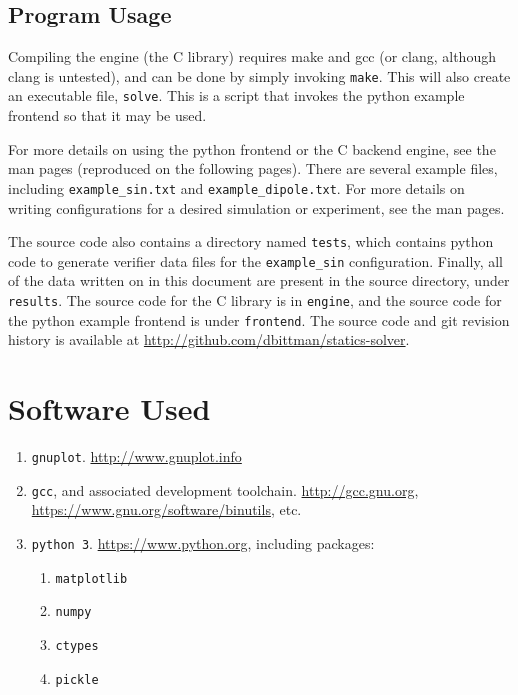 \documentclass[12pt]{article}
\begin{document}
\clearpage
\begin{appendices}
\section{Program Usage}

Compiling the engine (the C library) requires make and gcc (or clang, although clang is untested), and can
be done by simply invoking \texttt{make}. This will also create an executable file, \texttt{solve}. This
is a script that invokes the python example frontend so that it may be used.

For more details on using the python frontend or the C backend engine, see the man pages (reproduced on the
following pages). There are several example files, including \texttt{example\_sin.txt} and \texttt{example\_dipole.txt}.
For more details on writing configurations for a desired simulation or experiment, see the man pages.

The source code also contains a directory named \texttt{tests}, which contains python code to generate verifier data
files for the \texttt{example\_sin} configuration. Finally, all of the data written on in this document are present
in the source directory, under \texttt{results}. The source code for the C library is in \texttt{engine}, and the
source code for the python example frontend is under \texttt{frontend}. The source code and git revision history
is available at \url{http://github.com/dbittman/statics-solver}.

	\begin{singlespacing}


	\end{singlespacing}
\clearpage






\end{appendices}

\clearpage

\section*{Software Used}

\begin{enumerate}
	\item \texttt{gnuplot}. \url{http://www.gnuplot.info}
	\item \texttt{gcc}, and associated development toolchain. \url{http://gcc.gnu.org}, \url{https://www.gnu.org/software/binutils}, etc.
	\item \texttt{python 3}. \url{https://www.python.org}, including packages:
		\begin{enumerate}
			\item \texttt{matplotlib}
			\item \texttt{numpy}
			\item \texttt{ctypes}
			\item \texttt{pickle}
		\end{enumerate}
\end{enumerate}

\clearpage


\end{document}

